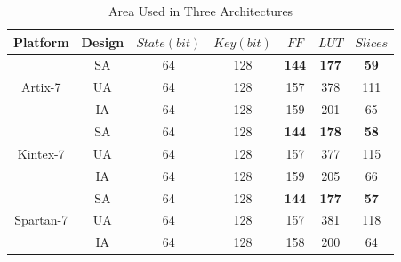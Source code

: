 \documentclass[final,5p,times,twocolumn]{elsarticle}
\begin{document}
\begin{table}[h]
    \color{blue}
    \caption{Area Used in Three Architectures}\label{area_compare}%
    \begin{tabular*}{\textwidth}{@{\extracolsep\fill}|c|c|c|c|c|c|c|}
        \hline
        Platform & Design & $State(bit)$ & $Key(bit)$ & $FF$ & $LUT$ & $Slices$ \\
        \hline
        \multirow{3}{*}{Artix-7}  & SA & 64 & 128 & \textbf{144} & \textbf{177} & \textbf{59} \\
        & UA & 64 & 128 & 157 & 378 & 111 \\
        & IA & 64 & 128 & 159 & 201 & 65 \\
        \hline
        \multirow{3}{*}{Kintex-7} & SA & 64 & 128 & \textbf{144} & \textbf{178} & \textbf{58}\\
        & UA & 64 & 128 & 157 & 377 & 115 \\
        & IA & 64 & 128 & 159 & 205 & 66 \\
        \hline
        \multirow{3}{*}{Spartan-7} & SA & 64 & 128 & \textbf{144} & \textbf{177} & \textbf{57}\\
        & UA & 64 & 128 & 157 & 381 & 118 \\
        & IA & 64 & 128 & 158 & 200 & 64 \\
        \hline
    \end{tabular*}
\end{table}
\end{document}
